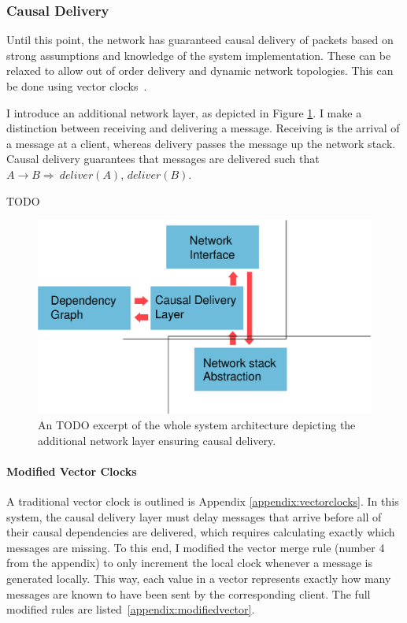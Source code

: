 \documentclass[12pt,a4paper,twoside,openright]{report}
\begin{document}
		
		\subsubsection{Causal Delivery} \label{sec:causaldelivery}
		Until this point, the network has guaranteed causal delivery of packets based on strong assumptions and knowledge of the system implementation. These can be relaxed to allow out of order delivery and dynamic network topologies. This can be done using vector clocks~\cite{fidge1987}.
		
		I introduce an additional network layer, as depicted in Figure \ref{fig:causal}. I make a distinction between receiving and delivering a message. Receiving is the arrival of a message at a client, whereas delivery passes the message up the network stack. Causal delivery guarantees that messages are delivered such that $A \rightarrow B \Rightarrow\ deliver(A)$, $deliver(B)$.
		
				TODO
	\begin{figure}[H]
	\centering
	\includegraphics[width=1\linewidth]{figs/causal_arch.eps}
	\caption[Ensuring Causal Delivery]{An TODO excerpt of the whole system architecture depicting the additional network layer ensuring causal delivery.}
	\label{fig:causal}
	\end{figure}

	
		\paragraph{Modified Vector Clocks} \label{sec:modifiedvectors}
		A traditional vector clock is outlined is Appendix \ref{appendix:vectorclocks}. In this system, the causal delivery layer must delay messages that arrive before all of their causal dependencies are delivered, which requires calculating exactly which messages are missing. To this end, I modified the vector merge rule (number 4 from the appendix) to only increment the local clock whenever a message is generated locally. This way, each value in a vector represents exactly how many messages are known to have been sent by the corresponding client. The full modified rules are listed~\cref{appendix:modifiedvector}.
		
\end{document}
